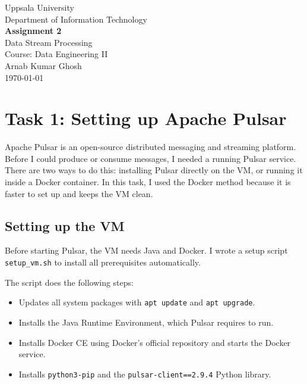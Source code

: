 \documentclass[11pt,a4paper]{article}
\begin{document}
\begin{titlepage}
  \centering
  \vspace*{2cm}
  {\large Uppsala University\\[0.3em]
   Department of Information Technology\\[2cm]}
  {\LARGE\bfseries Assignment 2\\[0.5em]}
  {\Large Data Stream Processing\\[2cm]}
  {\large Course: Data Engineering II\\[1.5cm]}
  {\normalsize Arnab Kumar Ghosh\\[0.5cm]}
  {\normalsize \today\\[3cm]}
  \vfill
\end{titlepage}

\tableofcontents
\newpage

\section{Task 1: Setting up Apache Pulsar}

Apache Pulsar is an open-source distributed messaging and streaming platform.
Before I could produce or consume messages, I needed a running Pulsar service.
There are two ways to do this: installing Pulsar directly on the VM, or running it
inside a Docker container. In this task, I used the Docker method because it is
faster to set up and keeps the VM clean.

\subsection{Setting up the VM}

Before starting Pulsar, the VM needs Java and Docker. I wrote a setup script
\texttt{setup\_vm.sh} to install all prerequisites automatically.

The script does the following steps:

\begin{itemize}[leftmargin=1.5cm]
  \item Updates all system packages with \texttt{apt update} and \texttt{apt upgrade}.
  \item Installs the Java Runtime Environment, which Pulsar requires to run.
  \item Installs Docker CE using Docker's official repository and starts the Docker service.
  \item Installs \texttt{python3-pip} and the
        \texttt{pulsar-client==2.9.4} Python library.
\end{itemize}
\end{document}
